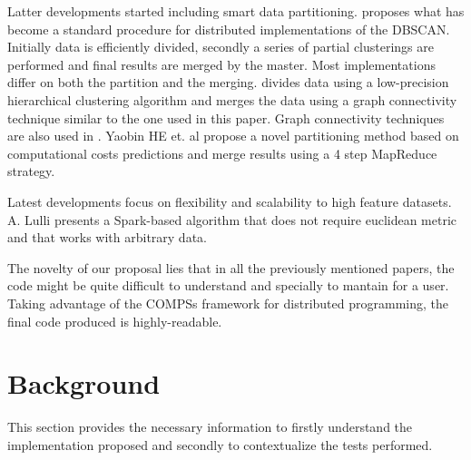\documentclass[10pt,journal,compsoc]{IEEEtran}
\begin{document}
Latter developments started including smart data partitioning. \cite{related_2} proposes what has become a standard procedure for distributed implementations of the DBSCAN. Initially data is efficiently divided, secondly a series of partial clusterings are performed and final results are merged by the master. Most implementations differ on both the partition and the merging. \cite{related_2} divides data using a low-precision hierarchical clustering algorithm and merges the data using a graph connectivity technique similar to the one used in this paper. Graph connectivity techniques are also used in \cite{related_4}. Yaobin HE et. al \cite{related_3} propose a novel partitioning method based on computational costs predictions and merge results using a 4 step MapReduce strategy. 

Latest developments focus on flexibility and scalability to high feature datasets. A. Lulli \cite{related_5} presents a Spark-based algorithm that does not require euclidean metric and that works with arbitrary data.

The novelty of our proposal lies that in all the previously mentioned papers, the code might be quite difficult to understand and specially to mantain for a user. Taking advantage of the COMPSs framework for distributed programming, the final code produced is highly-readable.







\section{Background} \label{sec:background}


This section provides the necessary information to firstly understand the implementation proposed and secondly to contextualize the tests performed.
\end{document}
